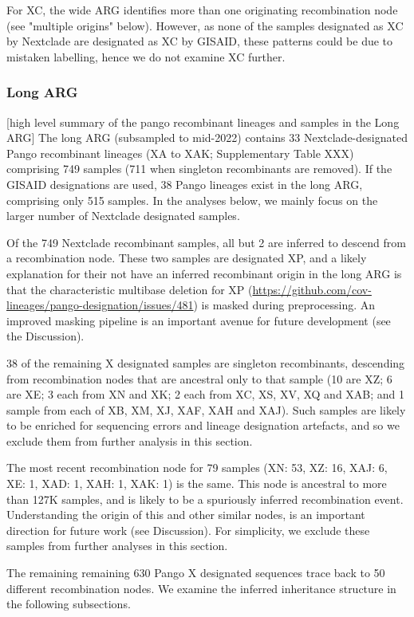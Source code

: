 \documentclass{article}
\begin{document}
For XC, the wide ARG identifies more than one originating recombination node
(see "multiple origins" below). However, as none of the samples designated as
XC by Nextclade are designated as XC by GISAID, these patterns could be due to
mistaken labelling, hence we do not examine XC further.

\subsubsection{Long ARG}
[high level summary of the pango recombinant lineages
and samples in the Long ARG]
The long ARG (subsampled to mid-2022) contains 33
Nextclade-designated Pango recombinant lineages (XA to XAK; Supplementary Table
XXX) comprising 749 samples (711 when singleton recombinants are removed). If
the GISAID designations are used, 38 Pango lineages exist in the long ARG,
comprising only 515 samples. In the analyses below, we mainly focus on the
larger number of Nextclade designated samples.

Of the 749 Nextclade recombinant samples, all but 2 are inferred to descend
from a recombination node. These two samples are designated XP, and a likely
explanation for their not have an inferred recombinant origin in the long ARG
is that the characteristic multibase deletion for XP
(\url{https://github.com/cov-lineages/pango-designation/issues/481}) is masked
during preprocessing. An improved masking pipeline is an important avenue for
future development (see the Discussion).

38 of the remaining X designated samples are singleton recombinants, descending
from recombination nodes that are ancestral only to that sample (10 are XZ; 6
are XE;  3 each from XN and XK; 2 each from XC, XS, XV, XQ and XAB; and 1
sample from each of XB, XM, XJ, XAF, XAH and XAJ). Such samples are likely to
be enriched for sequencing errors and lineage designation artefacts, and so we
exclude them from further analysis in this section.

The most recent recombination node for 79 samples (XN: 53, XZ: 16, XAJ: 6, XE:
1, XAD: 1, XAH: 1, XAK: 1) is the same. This node is ancestral to more than
127K samples, and is likely to be a spuriously inferred recombination event.
Understanding the origin of this and other similar nodes, is an important
direction for future work (see Discussion). For simplicity, we exclude these
samples from further analyses in this section.

The remaining remaining 630 Pango X designated sequences trace back to 50
different recombination nodes. We examine the inferred inheritance structure in
the following subsections.
\end{document}
